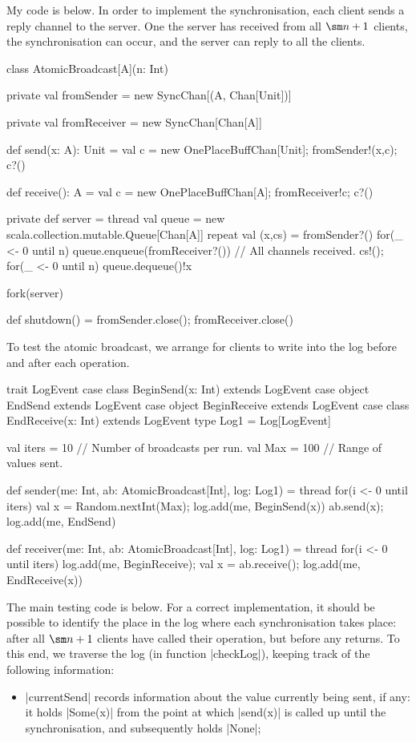 \begin{answerS}
My code is below.  In order to implement the synchronisation, each client
sends a reply channel to the server.  One the server has received from all
$\sm n+1$ clients, the synchronisation can occur, and the server can reply to
all the clients.
%
\begin{scala}
class AtomicBroadcast[A](n: Int){
  private val fromSender = new SyncChan[(A, Chan[Unit])]

  private val fromReceiver = new SyncChan[Chan[A]]

  def send(x: A): Unit = {
    val c = new OnePlaceBuffChan[Unit]; fromSender!(x,c); c?()
  }

  def receive(): A = {
    val c = new OnePlaceBuffChan[A]; fromReceiver!c; c?()
  }

  private def server = thread{
    val queue = new scala.collection.mutable.Queue[Chan[A]]
    repeat{
      val (x,cs) = fromSender?()
      for(_ <- 0 until n) queue.enqueue(fromReceiver?())
      // All channels received.
      cs!(); for(_ <- 0 until n) queue.dequeue()!x
    }
  }

  fork(server)

  def shutdown() = { fromSender.close(); fromReceiver.close() }
}
\end{scala}

To test the atomic broadcast, we arrange for clients to write into the log
before and after each operation.  

\begin{scala}
  trait LogEvent
  case class BeginSend(x: Int) extends LogEvent
  case object EndSend extends LogEvent
  case object BeginReceive extends LogEvent
  case class EndReceive(x: Int) extends LogEvent
  type Log1 = Log[LogEvent] 

  val iters = 10 // Number of broadcasts per run.
  val Max = 100 // Range of values sent.

  def sender(me: Int, ab: AtomicBroadcast[Int], log: Log1) = thread{
    for(i <- 0 until iters){
      val x = Random.nextInt(Max); log.add(me, BeginSend(x))
      ab.send(x); log.add(me, EndSend)
    }
  }

  def receiver(me: Int, ab: AtomicBroadcast[Int], log: Log1) = thread{
    for(i <- 0 until iters){
      log.add(me, BeginReceive); val x = ab.receive(); log.add(me, EndReceive(x))
    }
  }
\end{scala}

The main testing code is below.  For a correct implementation, it should be
possible to identify the place in the log where each synchronisation takes
place: after all $\sm n+1$ clients have called their operation, but before any
returns.  To this end, we traverse the log (in function |checkLog|), keeping
track of the following information:
%
\begin{itemize}
\item |currentSend| records information about the value currently being sent,
  if any: it holds |Some(x)| from the point at which |send(x)| is called up
  until the synchronisation, and subsequently holds |None|;


\end{itemize}
\end{answerS}
